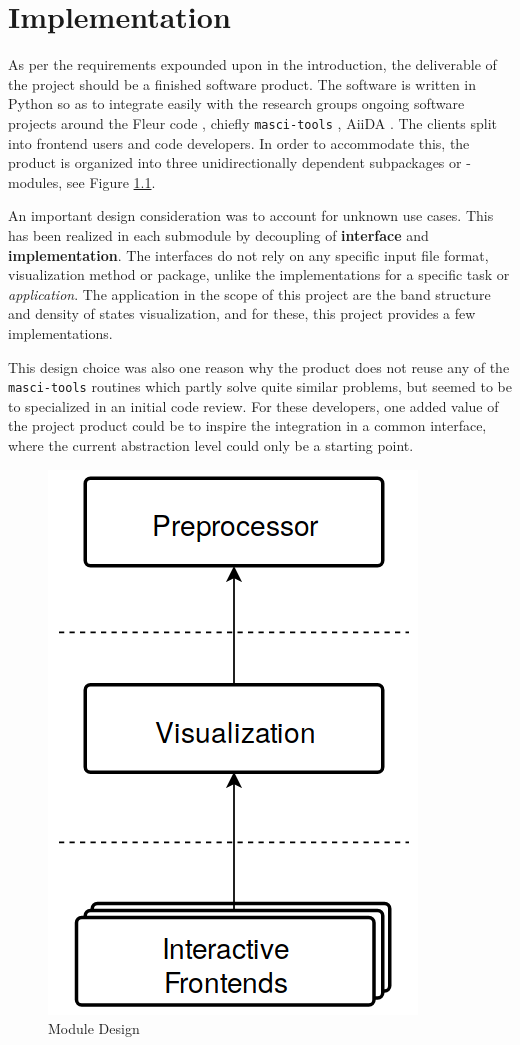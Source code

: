 
\chapter{Implementation}
\label{chap:implementation}


As per the requirements expounded upon in the introduction, the deliverable of
the project should be a finished software product. The software is written in
Python so as to integrate easily with the research groups ongoing software
projects around the Fleur code \cite{fleur}, chiefly \texttt{masci-tools}
\cite{masci-tools}, AiiDA \cite{aiida}. The clients split into frontend users
and code developers. In order to accommodate this, the product is organized into
three unidirectionally dependent subpackages or -modules, see Figure
\ref{fig:modules}.

An important design consideration was to account for unknown use cases. This has
been realized in each submodule by decoupling of \textbf{interface} and
\textbf{implementation}. The interfaces do not rely on any specific input file
format, visualization method or package, unlike the implementations for a
specific task or \emph{application}. The application in the scope of this
project are the band structure and density of states visualization, and for
these, this project provides a few implementations.

This design choice was also one reason why the product does not reuse any of the
\texttt{masci-tools} routines which partly solve quite similar problems, but
seemed to be to specialized in an initial code review. For these developers, one
added value of the project product could be to inspire the integration in a
common interface, where the current abstraction level could only be a starting
point.

\begin{figure}[htb!]
    \centering
    \includegraphics[width=0.3\linewidth]{img/module_design.png}
    \caption{Module Design}
    \label{fig:modules}
\end{figure}

